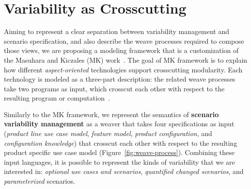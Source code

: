 \documentclass{acm_proc_article-sp}
\begin{document}


\section{Variability as Crosscutting}
\label{sec:models}

Aiming to represent a clear separation between variability management and scenario specification, and also 
describe the weave processes required to compose those views, we are proposing a modeling framework that is a 
customization of the Masuhara and Kiczales (MK) work~\cite{kiczales-ecoop-2003}. The goal of MK framework is to
explain how different \emph{aspect-oriented} technologies support crosscutting modularity. Each technology is modeled 
as a three-part description: the related weave processes take two programs as input, which crosscut each other with respect 
to the resulting program or computation~\cite{kiczales-ecoop-2003}. 

Similarly to the MK framework, we represent the semantics of \textbf{scenario variability management} as a weaver that takes four specifications
as input (\emph{product line use case model}, \emph{feature model}, \emph{product configuration}, and \emph{configuration knowledge}) that 
crosscut each other with respect to the resulting product specific use case model (Figure~\ref{fig:weave-process}). Combining these input languages, 
it is possible to represent the kinds of variability that we are interested in: \emph{optional use cases and scenarios}, \emph{quantified changed scenarios}, 
and \emph{parameterized} scenarios. 
\end{document}
